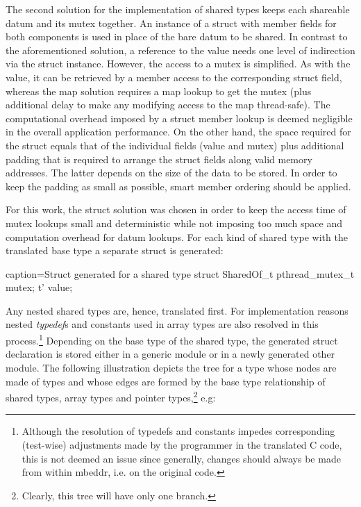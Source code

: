 The second solution for the implementation of shared types keeps each shareable datum and its mutex together. An instance of a struct with member fields for both components is used in place of the bare datum to be shared. In contrast to the aforementioned solution, a reference to the value  needs one level of indirection via the struct instance. However, the access to a mutex is simplified. As with the value, it can be retrieved by a member access to the corresponding struct field, whereas the map solution requires a map lookup to get the mutex (plus additional delay to make any modifying access to the map thread-safe). The computational overhead imposed by a struct member lookup is deemed negligible in the overall application performance. On the other hand, the space required for the struct equals that of the individual fields (value and mutex) plus additional padding \cite[pp.~303 ff.]{LinuxSystemProgramming} that is required to arrange the struct fields along valid memory addresses. The latter depends on the size of the data to be stored. In order to keep the padding as small as possible, smart member ordering should be applied. 

For this work, the struct solution was chosen in order to keep the access time of mutex lookups small and deterministic while not imposing too much space and computation overhead for datum lookups. For each kind of shared type  with the translated base type  a separate struct is generated:
\begin{ccode}{caption=Struct generated for a shared type}
struct SharedOf_t {
  pthread_mutex_t mutex;
  t' value;
}
\end{ccode}
Any nested shared types are, hence, translated first. For implementation reasons nested \textit{typedef}s and constants used in array types are also resolved in this process.\footnote{Although the resolution of typedefs and constants impedes corresponding (test-wise) adjustments made by the programmer in the translated C code, this is not deemed an issue since generally, changes should always be made from within mbeddr, i.e. on the original code.} Depending on the base type of the shared type, the generated struct declaration is stored either in a generic module or in a newly generated other module. The following illustration depicts the tree for a type  whose nodes are made of types and whose edges are formed by the base type relationship of shared types, array types and pointer types,\footnote{Clearly, this tree will have only one branch.} e.g: 


